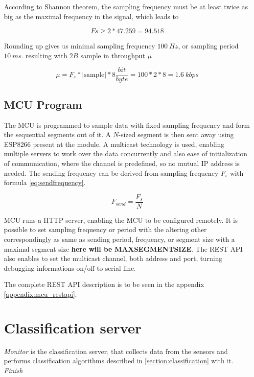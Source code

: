 According to Shannon theorem\cite{DigitalSignalProcessing}, the sampling frequency must be at least twice as big as the
maximal frequency in the signal, which leads to

\begin{equation}
Fs \geq 2*47.259 = 94.518 
\end{equation}

Rounding up gives us minimal sampling frequency $100~Hz$, or sampling period $10~ms$.
resulting with $2B$ sample in throughput $\mu$

\begin{equation}
\mu = F_s * |\text{sample}| * 8\frac{bit}{byte} = 100 * 2 * 8 = 1.6~kbps
\end{equation}


\subsection*{MCU Program}
The MCU is programmed to sample data with fixed sampling frequency and form the sequential
segments out of it. A $N$-sized segment is then sent away using ESP8266 present at the module.
A multicast technology is used, enabling multiple servers to work over the data concurrently
and also ease of initialization of communication, where the channel is predefined, so
no mutual IP address is needed. The sending frequency can be derived from sampling frequency $F_s$
with formula \ref{eq:sendfrequency}.

\begin{equation}
F_{send} = \frac{F_s}{N}
\label{eq:sendfrequency}
\end{equation}

MCU runs a HTTP server, enabling the MCU to be configured remotely. It is possible to set
sampling frequency or period with the altering other correspondingly as same as sending period,
frequency, or segment size with a maximal segment size \textbf{here will be MAXSEGMENTSIZE}.
The REST API also enables to set the multicast channel, both address and port, turning
debugging informations on/off to serial line.

The complete REST API description is to be seen in the appendix \ref{appendix:mcu_restapi}.




\section{Classification server}
{\it Monitor} is the classification server, that collects data from the sensors and performs
classification algorithms described in \ref{section:classification} with it. {\it Finish}

